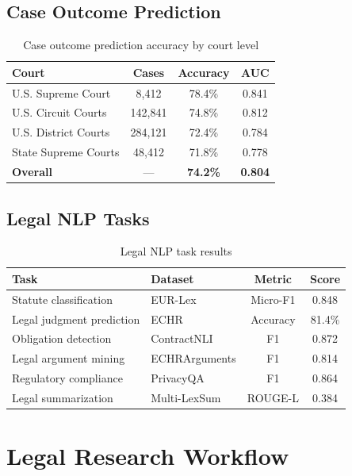 \documentclass[11pt,a4paper]{article}
\begin{document}
\subsection{Case Outcome Prediction}

\begin{table}[H]
\centering
\caption{Case outcome prediction accuracy by court level}
\label{tab:outcome}
\begin{tabular}{lccc}
\toprule
Court & Cases & Accuracy & AUC \\
\midrule
U.S. Supreme Court & 8,412 & 78.4\% & 0.841 \\
U.S. Circuit Courts & 142,841 & 74.8\% & 0.812 \\
U.S. District Courts & 284,121 & 72.4\% & 0.784 \\
State Supreme Courts & 48,412 & 71.8\% & 0.778 \\
\midrule
\textbf{Overall} & — & \textbf{74.2\%} & \textbf{0.804} \\
\bottomrule
\end{tabular}
\end{table}

\subsection{Legal NLP Tasks}

\begin{table}[H]
\centering
\caption{Legal NLP task results}
\label{tab:legal_nlp}
\begin{tabular}{llcc}
\toprule
Task & Dataset & Metric & Score \\
\midrule
Statute classification & EUR-Lex & Micro-F1 & 0.848 \\
Legal judgment prediction & ECHR & Accuracy & 81.4\% \\
Obligation detection & ContractNLI & F1 & 0.872 \\
Legal argument mining & ECHRArguments & F1 & 0.814 \\
Regulatory compliance & PrivacyQA & F1 & 0.864 \\
Legal summarization & Multi-LexSum & ROUGE-L & 0.384 \\
\bottomrule
\end{tabular}
\end{table}

\section{Legal Research Workflow}
\end{document}
